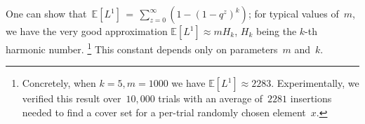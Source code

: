 One can show that~$\mathbb{E}[L^1]\,{=}\, \sum_{z=0}^{\infty} (1 - (1-q^z)^k)$; for typical values of~$m$, we have the very good approximation $ \mathbb{E}[L^1] \approx m H_k$, $H_k$ being the $k$-th harmonic number.
\footnote{Concretely, when $k=5,m=1000$ we have $\mathbb{E}[L^1]\approx 2283$. Experimentally, we verified this result over~$10,000$ trials with an average of~$2281$ insertions needed to find a cover set for a per-trial randomly chosen element~$x$.}  
This constant depends only on parameters~$m$ and~$k$.